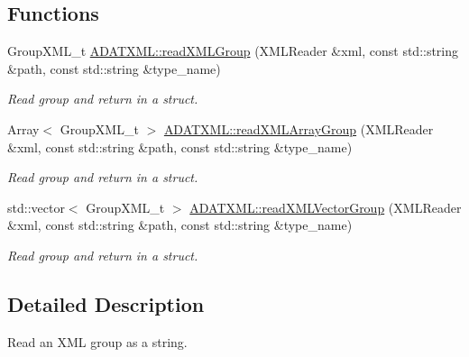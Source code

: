 \subsection*{Functions}
\begin{DoxyCompactItemize}
\item 
Group\+X\+M\+L\+\_\+t \mbox{\hyperlink{group__io_ga55d25898ac653a77ea446bee3682d29b}{A\+D\+A\+T\+X\+M\+L\+::read\+X\+M\+L\+Group}} (X\+M\+L\+Reader \&xml, const std\+::string \&path, const std\+::string \&type\+\_\+name)
\begin{DoxyCompactList}\small\item\em Read group and return in a struct. \end{DoxyCompactList}\item 
Array$<$ Group\+X\+M\+L\+\_\+t $>$ \mbox{\hyperlink{group__io_gadf35620dfa0c46f11572a9ffb3452847}{A\+D\+A\+T\+X\+M\+L\+::read\+X\+M\+L\+Array\+Group}} (X\+M\+L\+Reader \&xml, const std\+::string \&path, const std\+::string \&type\+\_\+name)
\begin{DoxyCompactList}\small\item\em Read group and return in a struct. \end{DoxyCompactList}\item 
std\+::vector$<$ Group\+X\+M\+L\+\_\+t $>$ \mbox{\hyperlink{group__io_ga3cd8ca33a23f0e4eafde989d168b8247}{A\+D\+A\+T\+X\+M\+L\+::read\+X\+M\+L\+Vector\+Group}} (X\+M\+L\+Reader \&xml, const std\+::string \&path, const std\+::string \&type\+\_\+name)
\begin{DoxyCompactList}\small\item\em Read group and return in a struct. \end{DoxyCompactList}\end{DoxyCompactItemize}


\subsection{Detailed Description}
Read an X\+ML group as a string. 

